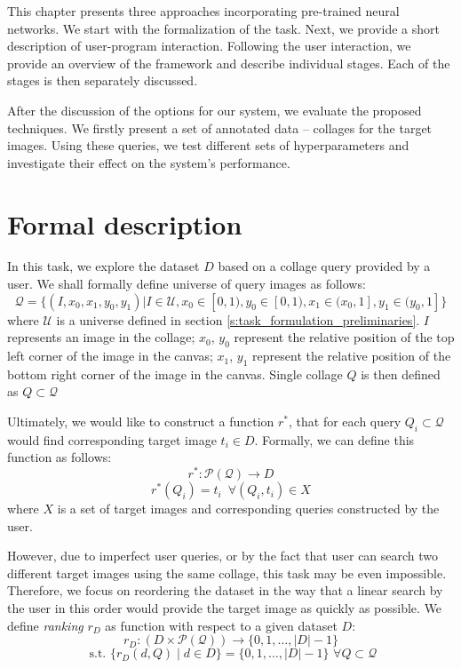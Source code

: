 This chapter presents three approaches incorporating pre-trained neural networks. We start with the formalization of the task. Next, we provide a short description of user-program interaction. Following the user interaction, we provide an overview of the framework and describe individual stages. Each of the stages is then separately discussed. 

After the discussion of the options for our system, we evaluate the proposed techniques. We firstly present a set of annotated data -- collages for the target images. Using these queries, we test different sets of hyperparameters and investigate their effect on the system's performance. 

\section{Formal description}
\label{s:task_formulation}

In this task, we explore the dataset $D$ based on a collage query provided by a user. We shall formally define universe of query images as follows: 
$$
    \mathcal{Q} = \{(I, x_0, x_1, y_0, y_1) | I \in \mathcal{U}, x_0 \in [0,1), y_0 \in [0, 1), x_1 \in (x_0, 1], y_1 \in (y_0, 1] \}
$$
where $\mathcal{U}$ is a universe defined in section \ref{s:task_formulation_preliminaries}. $I$ represents an image in the collage; $x_0$, $y_0$ represent the relative position of the top left corner of the image in the canvas; $x_1$, $y_1$ represent the relative position of the bottom right corner of the image in the canvas. Single collage $Q$ is then defined as $Q \subset \mathcal{Q}$

Ultimately, we would like to construct a function $r^*$, that for each query $Q_i \subset \mathcal{Q}$ would find corresponding target image $t_i \in D$. Formally, we can define this function as follows:
$$
    r^*: \mathcal{P(Q)} \rightarrow D 
$$
$$
    r^*(Q_i) = t_i \,\,\, \forall (Q_i, t_i) \in X
$$
where $X$ is a set of target images and corresponding queries constructed by the user.

However, due to imperfect user queries, or by the fact that user can search two different target images using the same collage, this task may be even impossible. Therefore, we focus on reordering the dataset in the way that a linear search by the user in this order would provide the target image as quickly as possible. We define \emph{ranking} $r_{D}$ as function with respect to a given dataset $D$:
$$
    r_D: (D \times \mathcal{P(Q)}) \rightarrow \{0, 1, \ldots, |D|-1  \}
$$
$$
    \text{ s.t. } \{r_D(d, Q) \mid d \in D \} = \{0, 1, \ldots, |D|-1  \} \,\, \forall Q \subset \mathcal{Q}
$$


